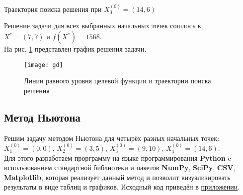 \begin{table}[H]
\begin{center}
	\caption{Траектория поиска решения при $X_3^{(0)} = (14, 6)$}
	\label{tab:trajectory-gd-3}
	\def\tabcolsep{10pt}
	\def\arraystretch{1.23}
	\fontsize{13}{14}\selectfont
\end{center}
\end{table}

Решение задачи для всех выбранных начальных точек сошлось к\\ $X^* = (7, 7)$ и $f(X^*) = 1568$.\\

На рис. \ref{pic:gd} представлен график решения задачи.

\begin{figure}[H]
\begin{center}
	\texttt{[image: gd]}
	\caption{Линии равного уровня целевой функции и траектории поиска решения}
	\label{pic:gd}
\end{center}
\end{figure}

\subsection{Метод Ньютона}

Решим задачу методом Ньютона для четырёх разных начальных точек: $X_1^{(0)} = (0, 0)$, $X_2^{(0)} = (3, 5)$, $X_3^{(0)} = (9, 10)$, $X_4^{(0)} = (14, 6)$.\\

Для этого разработаем прорграмму на языке программирования \textbf{Python} c использованием стандартной библиотеки и пакетов \textbf{NumPy}, \textbf{SciPy}, \textbf{CSV}, \textbf{Matplotlib}, которая реализует данный метод и позволит визуализировать результаты в виде таблиц и графиков.  Исходный код приведён в \hyperref[sec:application]{приложении}.\\

